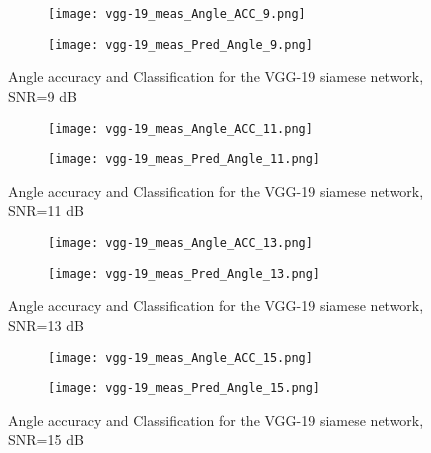   \begin{figure}[htbp]
    \centering
    \begin{subfigure}{.5\textwidth}
      \centering
      \texttt{[image: vgg-19\_meas\_Angle\_ACC\_9.png]}
    \end{subfigure}%
    \begin{subfigure}{.5\textwidth}
      \centering
      \texttt{[image: vgg-19\_meas\_Pred\_Angle\_9.png]}
    \end{subfigure}
    \caption{Angle accuracy and Classification for the VGG-19 siamese network, SNR=9 dB}
    \label{fig:vgg-19_snr10}
  \end{figure}

  \begin{figure}[htbp]
    \centering
    \begin{subfigure}{.5\textwidth}
      \centering
      \texttt{[image: vgg-19\_meas\_Angle\_ACC\_11.png]}
    \end{subfigure}%
    \begin{subfigure}{.5\textwidth}
      \centering
      \texttt{[image: vgg-19\_meas\_Pred\_Angle\_11.png]}
    \end{subfigure}
    \caption{Angle accuracy and Classification for the VGG-19 siamese network, SNR=11 dB}
    \label{fig:vgg-19_snr11}
  \end{figure}

  \begin{figure}[htbp]
    \centering
    \begin{subfigure}{.5\textwidth}
      \centering
      \texttt{[image: vgg-19\_meas\_Angle\_ACC\_13.png]}
    \end{subfigure}%
    \begin{subfigure}{.5\textwidth}
      \centering
      \texttt{[image: vgg-19\_meas\_Pred\_Angle\_13.png]}
    \end{subfigure}
    \caption{Angle accuracy and Classification for the VGG-19 siamese network, SNR=13 dB}
    \label{fig:vgg-19_snr12}
  \end{figure}

  \begin{figure}[htbp]
    \centering
    \begin{subfigure}{.5\textwidth}
      \centering
      \texttt{[image: vgg-19\_meas\_Angle\_ACC\_15.png]}
    \end{subfigure}%
    \begin{subfigure}{.5\textwidth}
      \centering
      \texttt{[image: vgg-19\_meas\_Pred\_Angle\_15.png]}
    \end{subfigure}
    \caption{Angle accuracy and Classification for the VGG-19 siamese network, SNR=15 dB}
    \label{fig:vgg-19_snr13}
  \end{figure}

